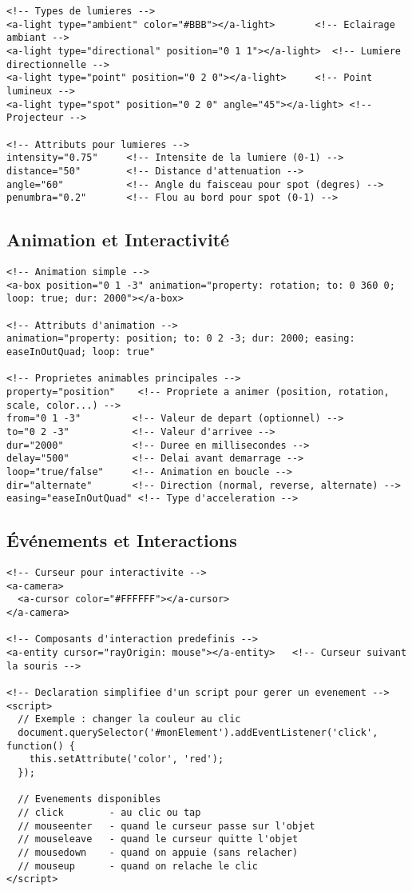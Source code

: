 \documentclass[12pt]{article}
\begin{document}
\begin{verbatim}
<!-- Types de lumieres -->
<a-light type="ambient" color="#BBB"></a-light>       <!-- Eclairage ambiant -->
<a-light type="directional" position="0 1 1"></a-light>  <!-- Lumiere directionnelle -->
<a-light type="point" position="0 2 0"></a-light>     <!-- Point lumineux -->
<a-light type="spot" position="0 2 0" angle="45"></a-light> <!-- Projecteur -->

<!-- Attributs pour lumieres -->
intensity="0.75"     <!-- Intensite de la lumiere (0-1) -->
distance="50"        <!-- Distance d'attenuation -->
angle="60"           <!-- Angle du faisceau pour spot (degres) -->
penumbra="0.2"       <!-- Flou au bord pour spot (0-1) -->
\end{verbatim}

\subsection{Animation et Interactivité}

\begin{verbatim}
<!-- Animation simple -->
<a-box position="0 1 -3" animation="property: rotation; to: 0 360 0; loop: true; dur: 2000"></a-box>

<!-- Attributs d'animation -->
animation="property: position; to: 0 2 -3; dur: 2000; easing: easeInOutQuad; loop: true"

<!-- Proprietes animables principales -->
property="position"    <!-- Propriete a animer (position, rotation, scale, color...) -->
from="0 1 -3"         <!-- Valeur de depart (optionnel) -->
to="0 2 -3"           <!-- Valeur d'arrivee -->
dur="2000"            <!-- Duree en millisecondes -->
delay="500"           <!-- Delai avant demarrage -->
loop="true/false"     <!-- Animation en boucle -->
dir="alternate"       <!-- Direction (normal, reverse, alternate) -->
easing="easeInOutQuad" <!-- Type d'acceleration -->
\end{verbatim}

\subsection{Événements et Interactions}

\begin{verbatim}
<!-- Curseur pour interactivite -->
<a-camera>
  <a-cursor color="#FFFFFF"></a-cursor>
</a-camera>

<!-- Composants d'interaction predefinis -->
<a-entity cursor="rayOrigin: mouse"></a-entity>   <!-- Curseur suivant la souris -->

<!-- Declaration simplifiee d'un script pour gerer un evenement -->
<script>
  // Exemple : changer la couleur au clic
  document.querySelector('#monElement').addEventListener('click', function() {
    this.setAttribute('color', 'red');
  });
  
  // Evenements disponibles
  // click        - au clic ou tap
  // mouseenter   - quand le curseur passe sur l'objet
  // mouseleave   - quand le curseur quitte l'objet
  // mousedown    - quand on appuie (sans relacher)
  // mouseup      - quand on relache le clic
</script>
\end{verbatim}
\end{document}

